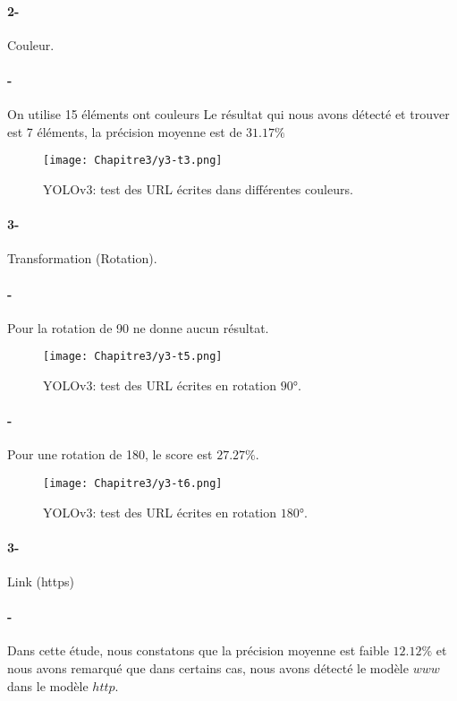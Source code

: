       \paragraph{2-} Couleur.
      \paragraph{-}  On utilise 15 éléments ont couleurs
       Le résultat qui nous avons détecté et trouver est 7 éléments,  la précision moyenne est de $31.17\%$
      \begin{figure}[H]
          \centering
           \texttt{[image: Chapitre3/y3-t3.png]}
           \caption{YOLOv3: test des URL écrites dans différentes couleurs.}
           \label{y3_t3}
           \end{figure}
     
      \paragraph{3-} Transformation (Rotation).
      \paragraph{-} Pour la rotation de 90 ne donne aucun résultat.
      \begin{figure}[H]
          \centering
           \texttt{[image: Chapitre3/y3-t5.png]}
           \caption{YOLOv3: test des URL écrites en rotation $90°$.}
           \label{y3_t5}
           \end{figure}
     
      \paragraph{-} Pour une rotation de 180, le score est $27.27\%$.
      \begin{figure}[H]
          \centering
           \texttt{[image: Chapitre3/y3-t6.png]}
           \caption{YOLOv3: test des URL écrites en rotation $180°$.}
           \label{y3_t6}
           \end{figure}

      \paragraph{3-}Link (https)
      \paragraph{-} Dans cette étude, nous constatons que  la précision moyenne  est faible $12.12\%$ et nous avons remarqué que dans certains cas, nous avons détecté le modèle $www$ dans le modèle $http$.
      
